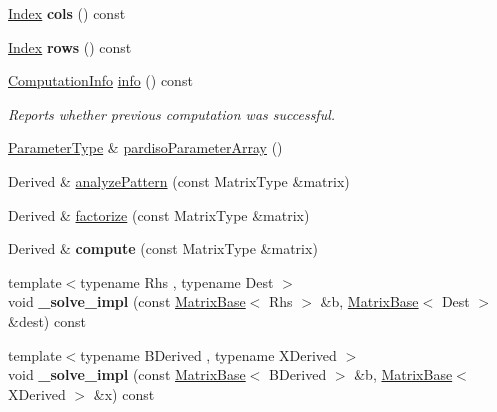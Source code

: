 \begin{DoxyCompactItemize}
\item 
\mbox{\label{class_eigen_1_1_pardiso_impl_a52a56fde447df457c27f808ae81857a6}} 
\hyperlink{namespace_eigen_a62e77e0933482dafde8fe197d9a2cfde}{Index} {\bfseries cols} () const
\item 
\mbox{\label{class_eigen_1_1_pardiso_impl_a4da5aaafb4964daee9855b897ebc3a4b}} 
\hyperlink{namespace_eigen_a62e77e0933482dafde8fe197d9a2cfde}{Index} {\bfseries rows} () const
\item 
\hyperlink{group__enums_ga85fad7b87587764e5cf6b513a9e0ee5e}{Computation\+Info} \hyperlink{class_eigen_1_1_pardiso_impl_a7dce1175518593e33d32e30ab0ffee3b}{info} () const
\begin{DoxyCompactList}\small\item\em Reports whether previous computation was successful. \end{DoxyCompactList}\item 
\hyperlink{group___core___module}{Parameter\+Type} \& \hyperlink{class_eigen_1_1_pardiso_impl_a42a7983796076edc52e0e8d2869610ec}{pardiso\+Parameter\+Array} ()
\item 
Derived \& \hyperlink{class_eigen_1_1_pardiso_impl_a28f40c0e86c35beaaf4d7e64301f6b6c}{analyze\+Pattern} (const Matrix\+Type \&matrix)
\item 
Derived \& \hyperlink{class_eigen_1_1_pardiso_impl_a107e316ad7ffcd683038164d9f804bff}{factorize} (const Matrix\+Type \&matrix)
\item 
\mbox{\label{class_eigen_1_1_pardiso_impl_ae91ac872a65c65ec5c388b005b9d5daa}} 
Derived \& {\bfseries compute} (const Matrix\+Type \&matrix)
\item 
\mbox{\label{class_eigen_1_1_pardiso_impl_a1735d09abb438a282ddca4c5bd05d993}} 
{\footnotesize template$<$typename Rhs , typename Dest $>$ }\\void {\bfseries \+\_\+solve\+\_\+impl} (const \hyperlink{group___core___module_class_eigen_1_1_matrix_base}{Matrix\+Base}$<$ Rhs $>$ \&b, \hyperlink{group___core___module_class_eigen_1_1_matrix_base}{Matrix\+Base}$<$ Dest $>$ \&dest) const
\item 
\mbox{\label{class_eigen_1_1_pardiso_impl_a5bc3793e432180b0e990bb8fedcb302d}} 
{\footnotesize template$<$typename B\+Derived , typename X\+Derived $>$ }\\void {\bfseries \+\_\+solve\+\_\+impl} (const \hyperlink{group___core___module_class_eigen_1_1_matrix_base}{Matrix\+Base}$<$ B\+Derived $>$ \&b, \hyperlink{group___core___module_class_eigen_1_1_matrix_base}{Matrix\+Base}$<$ X\+Derived $>$ \&x) const
\end{DoxyCompactItemize}
